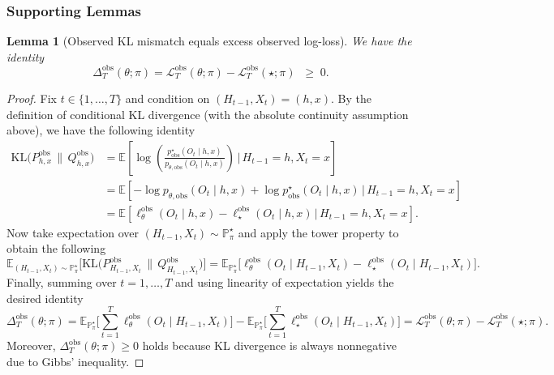 \documentclass[11pt]{article}
\newtheorem{lemma}{Lemma}
\renewcommand{\P}{\mathbb{P}}
\begin{document}
\subsubsection{Supporting Lemmas}
\label{apx:lemmalist_thm3}
\begin{lemma}[Observed KL mismatch equals excess observed log-loss]\label{lem:delta-obs-excess-Lobs}
We have the identity
\[
\Delta^{\mathrm{obs}}_T(\theta;\pi)
=
\mathcal{L}^{\mathrm{obs}}_T(\theta;\pi)
-
\mathcal{L}^{\mathrm{obs}}_T(\star;\pi)
\;\;\ge\; 0.
\]
\end{lemma}

\begin{proof}
Fix $t\in\{1,\dots,T\}$ and condition on $(H_{t-1},X_t)=(h,x)$. By the definition of conditional KL divergence (with the absolute continuity assumption above), we have the following identity
\begin{align*}
\mathrm{KL}\!\big(P^{\mathrm{obs}}_{h,x}\,\|\,Q^{\mathrm{obs}}_{h,x}\big)
&=
\mathbb{E}\!\left[
\log\!\left(
\frac{p^\star_{\mathrm{obs}}(O_t\mid h,x)}{p_{\theta,\mathrm{obs}}(O_t\mid h,x)}
\right)
\,\Big|\, H_{t-1}=h, X_t=x
\right] \\
&=
\mathbb{E}\!\left[
-\log p_{\theta,\mathrm{obs}}(O_t\mid h,x) + \log p^\star_{\mathrm{obs}}(O_t\mid h,x)
\,\Big|\, H_{t-1}=h, X_t=x
\right] \\
&=
\mathbb{E}\!\left[
\ell^{\mathrm{obs}}_\theta(O_t\mid h,x) - \ell^{\mathrm{obs}}_\star(O_t\mid h,x)
\,\Big|\, H_{t-1}=h, X_t=x
\right].
\end{align*}
Now take expectation over $(H_{t-1},X_t)\sim \P^\star_\pi$ and apply the tower property to obtain the following
\[
\mathbb{E}_{(H_{t-1},X_t)\sim \P^\star_\pi}
\Big[\mathrm{KL}\!\big(P^{\mathrm{obs}}_{H_{t-1},X_t}\,\|\,Q^{\mathrm{obs}}_{H_{t-1},X_t}\big)\Big]
=
\mathbb{E}_{\P^\star_\pi}\!\big[\ell^{\mathrm{obs}}_\theta(O_t\mid H_{t-1},X_t) - \ell^{\mathrm{obs}}_\star(O_t\mid H_{t-1},X_t)\big].
\]
Finally, summing over $t=1,\dots,T$ and using linearity of expectation yields the desired identity
\[
\Delta^{\mathrm{obs}}_T(\theta;\pi)
=
\mathbb{E}_{\P^\star_\pi}\!\Big[\sum_{t=1}^T \ell^{\mathrm{obs}}_\theta(O_t\mid H_{t-1},X_t)\Big]
-
\mathbb{E}_{\P^\star_\pi}\!\Big[\sum_{t=1}^T \ell^{\mathrm{obs}}_\star(O_t\mid H_{t-1},X_t)\Big]
=
\mathcal{L}^{\mathrm{obs}}_T(\theta;\pi) - \mathcal{L}^{\mathrm{obs}}_T(\star;\pi).
\]
Moreover, $\Delta^{\mathrm{obs}}_T(\theta;\pi)\ge 0$ holds because KL divergence is always nonnegative due to Gibbs' inequality.
\end{proof}
\end{document}
